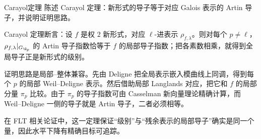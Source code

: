\begin{problem}{Carayol定理}
陈述 Carayol 定理：新形式的导子等于对应 Galois 表示的 Artin 导子，并说明证明思路。
\end{problem}
\begin{solution}
Carayol 定理断言：设 $f$ 是权 $2$ 新形式，对应 $\ell$-进表示 $\rho_{f,\lambda}$。则对每个 $p\neq \ell$，$\rho_{f,\lambda}|_{G_{\Q_p}}$ 的 Artin 导子指数恰等于 $f$ 的局部导子指数；把各素数相乘，就得到全局导子正是新形式的级别。

证明思路是局部--整体兼容。先由 Deligne 把全局表示嵌入模曲线上同调，得到每个 $p$ 的局部 Weil--Deligne 表示。然后借助局部 Langlands 对应，把它和 $f$ 的局部分量 $\pi_p$ 比较。由于 $\pi_p$ 的导子指数可由 Casselman 新向量理论精确计算，而 Weil--Deligne 一侧的导子就是 Artin 导子，二者必须相等。

在 FLT 相关论证中，这一定理保证“级别”与“残余表示的局部导子”确实是同一个量，因此水平下降有精确目标可追踪。
\end{solution}
